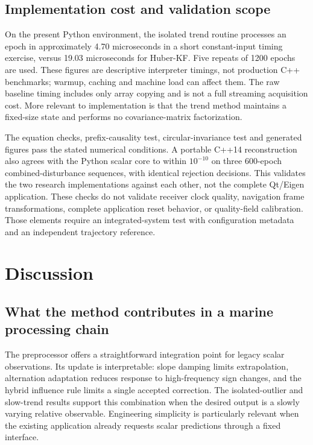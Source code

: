 \documentclass[12pt,a4paper]{article}
\begin{document}
\subsection{Implementation cost and validation scope}
On the present Python environment, the isolated trend routine processes an epoch in approximately 4.70 microseconds in a short constant-input timing exercise, versus 19.03 microseconds for Huber-KF. Five repeats of 1200 epochs are used. These figures are descriptive interpreter timings, not production C++ benchmarks; warmup, caching and machine load can affect them. The raw baseline timing includes only array copying and is not a full streaming acquisition cost. More relevant to implementation is that the trend method maintains a fixed-size state and performs no covariance-matrix factorization.

The equation checks, prefix-causality test, circular-invariance test and generated figures pass the stated numerical conditions. A portable C++14 reconstruction also agrees with the Python scalar core to within $10^{-10}$ on three 600-epoch combined-disturbance sequences, with identical rejection decisions. This validates the two research implementations against each other, not the complete Qt/Eigen application. These checks do not validate receiver clock quality, navigation frame transformations, complete application reset behavior, or quality-field calibration. Those elements require an integrated-system test with configuration metadata and an independent trajectory reference.

\section{Discussion}
\subsection{What the method contributes in a marine processing chain}
The preprocessor offers a straightforward integration point for legacy scalar observations. Its update is interpretable: slope damping limits extrapolation, alternation adaptation reduces response to high-frequency sign changes, and the hybrid influence rule limits a single accepted correction. The isolated-outlier and slow-trend results support this combination when the desired output is a slowly varying relative observable. Engineering simplicity is particularly relevant when the existing application already requests scalar predictions through a fixed interface.
\end{document}
